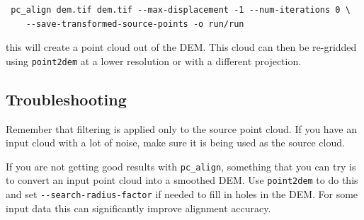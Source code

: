 \begin{verbatim}
 pc_align dem.tif dem.tif --max-displacement -1 --num-iterations 0 \
    --save-transformed-source-points -o run/run
\end{verbatim}

this will create a point cloud out of the DEM. This cloud can then be
re-gridded using \texttt{point2dem} at a lower resolution or with a 
different projection. 

\subsection{Troubleshooting}

Remember that filtering is applied only to the source point cloud.
If you have an input cloud with a lot of noise, make sure it is
being used as the source cloud.

If you are not getting good results with \texttt{pc\_align}, something
that you can try is to convert an input point cloud into a smoothed DEM.
Use \texttt{point2dem} to do this and set \texttt{-\/-search-radius-factor}
if needed to fill in holes in the DEM.  For some input data this can
significantly improve alignment accuracy.

\medskip

